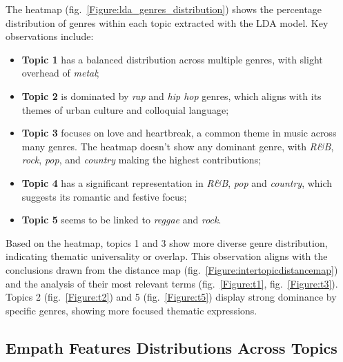 The heatmap (fig.~\ref{Figure:lda_genres_distribution}) shows the percentage
distribution of genres within each topic extracted with the LDA model. Key
observations include:

\begin{itemize}
  \item \textbf{Topic 1} has a balanced distribution across multiple genres,
    with slight overhead of \textit{metal};
  \item \textbf{Topic 2} is dominated by \textit{rap} and \textit{hip hop}
    genres, which aligns with its themes of urban culture and colloquial
    language;
  \item \textbf{Topic 3} focuses on love and heartbreak, a common theme in
    music across many genres. The heatmap doesn't show any dominant genre, with
    \textit{R\&B}, \textit{rock}, \textit{pop}, and \textit{country} making the
    highest contributions;
  \item \textbf{Topic 4} has a significant representation in \textit{R\&B},
    \textit{pop} and \textit{country}, which suggests its romantic and festive
    focus;
  \item \textbf{Topic 5} seems to be linked to \textit{reggae} and
    \textit{rock}.
\end{itemize}

Based on the heatmap, topics 1 and 3 show more diverse genre distribution,
indicating thematic universality or overlap. This observation aligns with the
conclusions drawn from the  distance map
(fig.~\ref{Figure:intertopicdistancemap}) and the analysis of their most
relevant terms (fig.~\ref{Figure:t1}, fig.~\ref{Figure:t3}). Topics 2
(fig.~\ref{Figure:t2}) and 5 (fig.~\ref{Figure:t5}) display strong dominance by
specific genres, showing more focused thematic expressions.


\subsection{Empath Features Distributions Across Topics}

